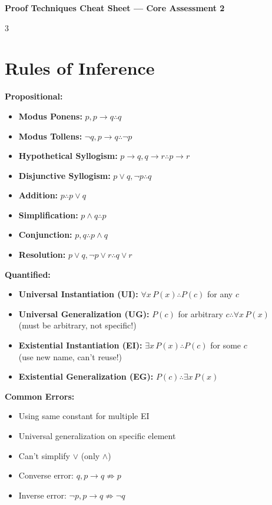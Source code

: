 \documentclass[8pt]{article}
\begin{document}
\begin{center}
\textbf{\large Proof Techniques Cheat Sheet --- Core Assessment 2}
\end{center}
\vspace{-6pt}

\begin{multicols}{3}
\small

\section*{Rules of Inference}
\textbf{Propositional:}
\begin{itemize}[nosep]
\item \textbf{Modus Ponens:} $p, p \to q \therefore q$
\item \textbf{Modus Tollens:} $\neg q, p \to q \therefore \neg p$
\item \textbf{Hypothetical Syllogism:} $p \to q, q \to r \therefore p \to r$
\item \textbf{Disjunctive Syllogism:} $p \lor q, \neg p \therefore q$
\item \textbf{Addition:} $p \therefore p \lor q$
\item \textbf{Simplification:} $p \land q \therefore p$
\item \textbf{Conjunction:} $p, q \therefore p \land q$
\item \textbf{Resolution:} $p \lor q, \neg p \lor r \therefore q \lor r$
\end{itemize}

\textbf{Quantified:}
\begin{itemize}[nosep]
\item \textbf{Universal Instantiation (UI):} $\forall x\, P(x) \therefore P(c)$ for any $c$
\item \textbf{Universal Generalization (UG):} $P(c)$ for arbitrary $c \therefore \forall x\, P(x)$
  \\ (must be arbitrary, not specific!)
\item \textbf{Existential Instantiation (EI):} $\exists x\, P(x) \therefore P(c)$ for some $c$
  \\ (use new name, can't reuse!)
\item \textbf{Existential Generalization (EG):} $P(c) \therefore \exists x\, P(x)$
\end{itemize}

\textbf{Common Errors:}
\begin{itemize}[nosep]
\item Using same constant for multiple EI
\item Universal generalization on specific element
\item Can't simplify $\lor$ (only $\land$)
\item Converse error: $q, p \to q \not\Rightarrow p$
\item Inverse error: $\neg p, p \to q \not\Rightarrow \neg q$
\end{itemize}
\newcolumn

\end{multicols}
\end{document}
